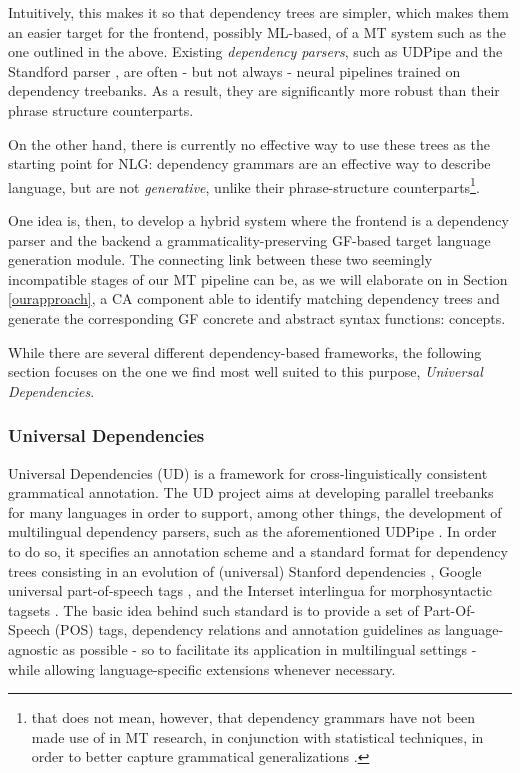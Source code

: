 Intuitively, this makes it so that dependency trees are simpler, which makes them an easier target for the frontend, possibly ML-based, of a MT system such as the one outlined in the above. 
Existing \textit{dependency parsers}, such as UDPipe \cite{udpipe1} and the Standford parser \cite{standford}, are often - but not always \cite{rasp} - neural pipelines trained on dependency treebanks. As a result, they are significantly more robust than their phrase structure counterparts. 

On the other hand, there is currently no effective way to use these trees as the starting point for NLG: dependency grammars are an effective way to describe language, but are not \textit{generative}, unlike their phrase-structure counterparts\footnote{that does not mean, however, that dependency grammars have not been made use of in MT research, in conjunction with statistical techniques, in order to better capture grammatical generalizations \cite{treelet}.}. \smallskip

One idea is, then, to develop a hybrid system where the frontend is a dependency parser and the backend a grammaticality-preserving GF-based target language generation module. 
The connecting link between these two seemingly incompatible stages of our MT pipeline can be, as we will elaborate on in Section \ref{ourapproach}, a CA component able to identify matching dependency trees and generate the corresponding GF concrete and abstract syntax functions: concepts.

While there are several different dependency-based frameworks, the following section focuses on the one we find most well suited to this purpose, \textit{Universal Dependencies}. 

\subsubsection{Universal Dependencies} \label{ud} 
Universal Dependencies (UD) is a framework for cross-linguistically consistent grammatical annotation. 
The UD project aims at developing parallel treebanks for many languages in order to support, among other things, the development of multilingual dependency parsers, such as the aforementioned UDPipe \cite{udpipe1}. 
In order to do so, it specifies an annotation scheme and a standard format for dependency trees consisting in an evolution of (universal) Stanford dependencies \cite{st1, st2}, Google universal part-of-speech tags \cite{upos}, and the Interset interlingua for morphosyntactic tagsets \cite{tagconv}. The basic idea behind such standard is to provide a set of Part-Of-Speech (POS) tags, dependency relations and annotation guidelines as language-agnostic as possible - so to facilitate its application in multilingual settings - while allowing language-specific extensions whenever necessary. \smallskip

